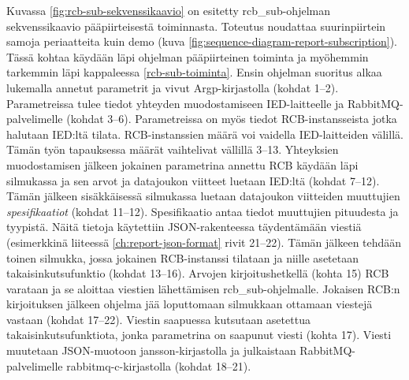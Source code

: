 Kuvassa \ref{fig:rcb-sub-sekvenssikaavio} on esitetty rcb\_sub-ohjelman sekvenssikaavio pääpiirteisestä toiminnasta. Toteutus noudattaa suurinpiirtein samoja periaatteita kuin demo (kuva \ref{fig:sequence-diagram-report-subscription}). Tässä kohtaa käydään läpi ohjelman pääpiirteinen toiminta ja myöhemmin tarkemmin läpi kappaleessa \ref{rcb-sub-toiminta}. Ensin ohjelman suoritus alkaa lukemalla annetut parametrit ja vivut Argp-kirjastolla (kohdat 1--2). Parametreissa tulee tiedot yhteyden muodostamiseen IED-laitteelle ja RabbitMQ-palvelimelle (kohdat 3--6). Parametreissa on myös tiedot RCB-instansseista jotka halutaan IED:ltä tilata. RCB-instanssien määrä voi vaidella IED-laitteiden välillä. Tämän työn tapauksessa määrät vaihtelivat vällillä 3--13. Yhteyksien muodostamisen jälkeen jokainen parametrina annettu RCB käydään läpi silmukassa ja sen arvot ja datajoukon viitteet luetaan IED:ltä (kohdat 7--12). Tämän jälkeen sisäkkäisessä silmukassa luetaan datajoukon viitteiden muuttujien \emph{spesifikaatiot} (kohdat 11--12). Spesifikaatio antaa tiedot muuttujien pituudesta ja tyypistä. Näitä tietoja käytettiin JSON-rakenteessa täydentämään viestiä (esimerkkinä liiteessä \ref{ch:report-json-format} rivit 21--22). Tämän jälkeen tehdään toinen silmukka, jossa jokainen RCB-instanssi tilataan ja niille asetetaan takaisinkutsufunktio (kohdat 13--16). Arvojen kirjoitushetkellä (kohta 15) RCB varataan ja se aloittaa viestien lähettämisen rcb\_sub-ohjelmalle. Jokaisen RCB:n kirjoituksen jälkeen ohjelma jää loputtomaan silmukkaan ottamaan viestejä vastaan (kohdat 17--22). Viestin saapuessa kutsutaan asetettua takaisinkutsufunktiota, jonka parametrina on saapunut viesti (kohta 17). Viesti muutetaan JSON-muotoon jansson-kirjastolla ja julkaistaan RabbitMQ-palvelimelle rabbitmq-c-kirjastolla (kohdat 18--21).

